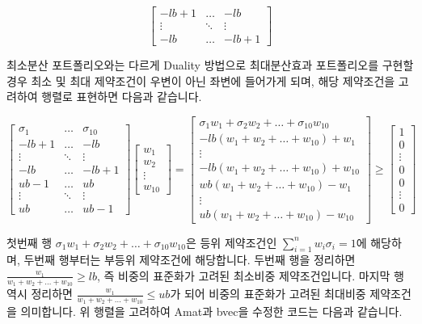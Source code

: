 \documentclass[12pt,]{book}
\begin{document}
\[\begin{bmatrix} -lb  + 1 & \dots & -lb \\ \vdots & \ddots & \vdots \\ -lb & \dots & -lb + 1 \end{bmatrix}\]

최소분산 포트폴리오와는 다르게 Duality 방법으로 최대분산효과 포트폴리오를 구현할 경우 최소 및 최대 제약조건이 우변이 아닌 좌변에 들어가게 되며, 해당 제약조건을 고려하여 행렬로 표현하면 다음과 같습니다.

\[ \begin{bmatrix}
\sigma_1 & \dots & \sigma_{10} \\ -lb + 1 & \dots & -lb \\ \vdots & \ddots & \vdots \\
-lb & \dots & -lb + 1 \\ ub-1 & \dots &  ub \\ \vdots & \ddots & \vdots \\ ub & \dots & ub-1 \end{bmatrix}
\begin{bmatrix} w_1 \\ w_2 \\ \vdots \\ w_{10} \end{bmatrix} = 
\begin{bmatrix} \sigma_1w_1 + \sigma_2w_2 + \dots + \sigma_{10}w_{10} \\ -lb(w_1 + w_2 + \dots + w_{10}) + w_1 \\ \vdots \\ -lb(w_1 + w_2 + \dots + w_{10}) + w_{10} \\
wb(w_1 + w_2 + \dots + w_{10}) - w_1 \\ \vdots \\
ub(w_1 + w_2 + \dots + w_{10}) - w_{10}
\end{bmatrix} \ge \begin{bmatrix} 1 \\ 0 \\ \vdots \\ 0 \\ 0 \\ \vdots \\ 0 \end{bmatrix} \]

첫번째 행 \(\sigma_1w_1 + \sigma_2w_2 + \dots + \sigma_{10}w_{10}\)은 등위 제약조건인 \(\sum_{i=1}^n w_i \sigma_i = 1\)에 해당하며, 두번째 행부터는 부등위 제약조건에 해당합니다. 두번째 행을 정리하면 \(\frac{w_1}{w_1+w_2+\dots+w_{10}} \ge lb\), 즉 비중의 표준화가 고려된 최소비중 제약조건입니다. 마지막 행 역시 정리하면 \(\frac{w_1}{w_1+w_2+\dots+w_{10}} \le ub\)가 되어 비중의 표준화가 고려된 최대비중 제약조건을 의미합니다. 위 행렬을 고려하여 Amat과 bvec을 수정한 코드는 다음과 같습니다.
\end{document}
